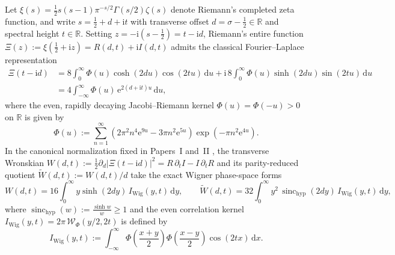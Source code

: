 \documentclass[11pt,a4paper,reqno]{amsart}
\theoremstyle{definition}
\theoremstyle{remark}
\numberwithin{equation}{section}
\newcommand{\dd}{\mathrm{d}}
\newcommand{\ii}{\mathrm{i}}
\newcommand{\ee}{\mathrm{e}}
\newcommand{\Wig}{\mathcal{W}}
\newcommand{\Wtil}{\widetilde{W}}
\newcommand{\sinch}{\operatorname{sinc}_{\mathrm{hyp}}}
\begin{document}
Let $\xi(s) = \frac{1}{2}s(s-1)\pi^{-s/2}\Gamma(s/2)\zeta(s)$ denote Riemann's completed zeta function, and write $s = \frac{1}{2} + d + \ii t$ with transverse offset $d = \sigma - \frac{1}{2} \in \mathbb{R}$ and spectral height $t \in \mathbb{R}$. Setting $z = -\ii(s - \frac{1}{2}) = t - \ii d$, Riemann's entire function $\Xi(z) := \xi(\frac{1}{2} + \ii z) = R(d,t) + \ii I(d,t)$ admits the classical Fourier--Laplace representation \cite{Riemann1859,Polya1926,Titchmarsh1986}
\begin{equation}\label{eq:Xi_integral}
\begin{aligned}
\Xi(t - \ii d) &= 8\int_0^\infty \Phi(u)\cosh(2d u)\cos(2t u)\,\dd u + \ii\,8\int_0^\infty \Phi(u)\sinh(2d u)\sin(2t u)\,\dd u \\
&= 4\int_{-\infty}^\infty \Phi(u)\,\ee^{2(d + \ii t)u}\,\dd u,
\end{aligned}
\end{equation}
where the even, rapidly decaying Jacobi--Riemann kernel $\Phi(u) = \Phi(-u) > 0$ on $\mathbb{R}$ is given by
\begin{equation}\label{eq:Phi_def}
\Phi(u) := \sum_{n=1}^\infty \left(2\pi^2 n^4 \ee^{9u} - 3\pi n^2 \ee^{5u}\right)\exp\left(-\pi n^2 \ee^{4u}\right).
\end{equation}
In the canonical normalization fixed in Papers~I and~II \cite{Missiaen2026Paper1,Missiaen2026Paper2}, the transverse Wronskian $W(d,t) := \frac{1}{2}\partial_d|\Xi(t-\ii d)|^2 = R\,\partial_t I - I\,\partial_t R$ and its parity-reduced quotient $\Wtil(d,t) := W(d,t)/d$ take the exact Wigner phase-space forms
\begin{equation}\label{eq:W_canonical}
W(d,t) = 16\int_0^\infty y\sinh(2d y)\,I_{\mathrm{Wig}}(y,t)\,\dd y, \qquad
\Wtil(d,t) = 32\int_0^\infty y^2\,\sinch(2d y)\,I_{\mathrm{Wig}}(y,t)\,\dd y,
\end{equation}
where $\sinch(w) := \frac{\sinh w}{w} \ge 1$ and the even correlation kernel $I_{\mathrm{Wig}}(y,t) = 2\pi\,\Wig_\Phi(y/2, 2t)$ is defined by
\begin{equation}\label{eq:IWig_def}
I_{\mathrm{Wig}}(y,t) := \int_{-\infty}^\infty \Phi\left(\frac{x+y}{2}\right)\Phi\left(\frac{x-y}{2}\right)\cos(2t x)\,\dd x.
\end{equation}
\end{document}
